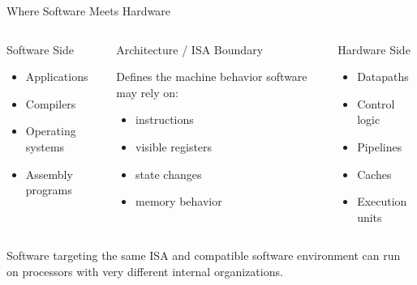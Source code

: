\documentclass[aspectratio=169,11pt,t]{beamer}
\begin{document}

\begin{frame}{Where Software Meets Hardware}

\begin{columns}[T,onlytextwidth]


\begin{block}{Software Side}

\begin{itemize}
  \item Applications
  \item Compilers
  \item Operating systems
  \item Assembly programs
\end{itemize}

\end{block}


\begin{block}{Architecture / ISA Boundary}

Defines the machine behavior
software may rely on:

\begin{itemize}
  \item instructions
  \item visible registers
  \item state changes
  \item memory behavior
\end{itemize}

\end{block}


\begin{block}{Hardware Side}

\begin{itemize}
  \item Datapaths
  \item Control logic
  \item Pipelines
  \item Caches
  \item Execution units
\end{itemize}

\end{block}

\end{columns}

\vspace{0.25cm}

Software targeting the same ISA
and compatible software environment
can run on processors
with very different internal organizations.

\end{frame}
\end{document}
